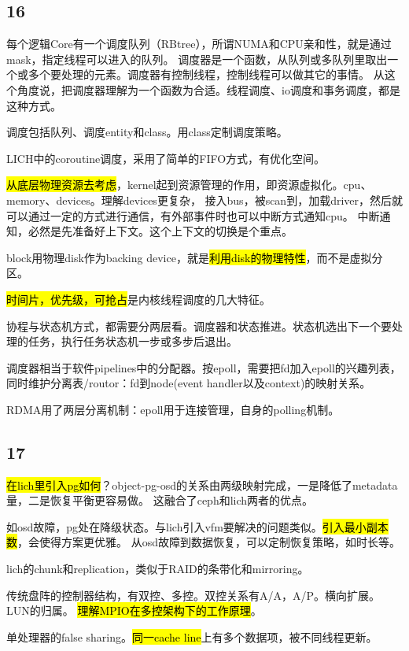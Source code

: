 \subsection{16}

每个逻辑Core有一个调度队列（RBtree），所谓NUMA和CPU亲和性，就是通过mask，指定线程可以进入的队列。
调度器是一个函数，从队列或多队列里取出一个或多个要处理的元素。调度器有控制线程，控制线程可以做其它的事情。
从这个角度说，把调度器理解为一个函数为合适。线程调度、io调度和事务调度，都是这种方式。

调度包括队列、调度entity和class。用class定制调度策略。

LICH中的coroutine调度，采用了简单的FIFO方式，有优化空间。

\hl{从底层物理资源去考虑}，kernel起到资源管理的作用，即资源虚拟化。cpu、memory、devices。理解devices更复杂，
接入bus，被scan到，加载driver，然后就可以通过一定的方式进行通信，有外部事件时也可以中断方式通知cpu。
中断通知，必然是先准备好上下文。这个上下文的切换是个重点。

block用物理disk作为backing device，就是\hl{利用disk的物理特性}，而不是虚拟分区。

\hl{时间片，优先级，可抢占}是内核线程调度的几大特征。

协程与状态机方式，都需要分两层看。调度器和状态推进。状态机选出下一个要处理的任务，执行任务状态机一步或多步后退出。

调度器相当于软件pipelines中的分配器。按epoll，需要把fd加入epoll的兴趣列表，
同时维护分离表/routor：fd到node(event handler以及context)的映射关系。

RDMA用了两层分离机制：epoll用于连接管理，自身的polling机制。

\subsection{17}

\hl{在lich里引入pg如何}？object-pg-osd的关系由两级映射完成，一是降低了metadata量，二是恢复平衡更容易做。
这融合了ceph和lich两者的优点。

如osd故障，pg处在降级状态。与lich引入vfm要解决的问题类似。\hl{引入最小副本数}，会使得方案更优雅。
从osd故障到数据恢复，可以定制恢复策略，如时长等。

lich的chunk和replication，类似于RAID的条带化和mirroring。

传统盘阵的控制器结构，有双控、多控。双控关系有A/A，A/P。横向扩展。LUN的归属。
\hl{理解MPIO在多控架构下的工作原理}。

单处理器的false sharing。\hl{同一cache line}上有多个数据项，被不同线程更新。

